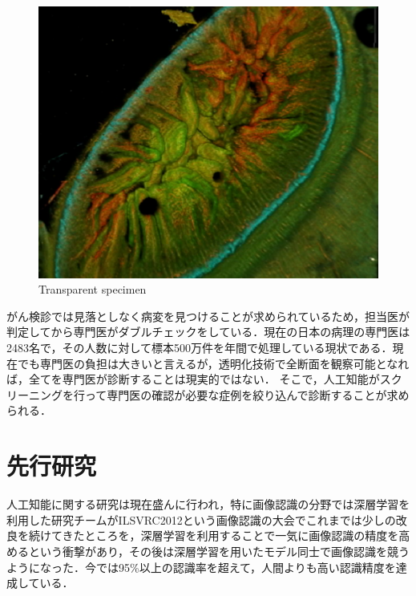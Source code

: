 \begin{figure}[H]
\begin{minipage}{0.4\columnwidth}
	\end{minipage}
	\begin{minipage}{0.4\columnwidth}
		\centering
		\includegraphics[clip, width=\linewidth]{fig/chapter1/colon_microscope}
	\end{minipage}
	\caption{Transparent specimen}
	\label{fig:lucid}
\end{figure}

がん検診では見落としなく病変を見つけることが求められているため，担当医が判定してから専門医がダブルチェックをしている．現在の日本の病理の専門医は2483名\cite{pathology}で，その人数に対して標本500万件を年間で処理している現状である．現在でも専門医の負担は大きいと言えるが，透明化技術で全断面を観察可能となれば，全てを専門医が診断することは現実的ではない．
そこで，人工知能がスクリーニングを行って専門医の確認が必要な症例を絞り込んで診断することが求められる．

\section{先行研究}
人工知能に関する研究は現在盛んに行われ，特に画像認識の分野では深層学習\cite{lecun2015deep}を利用した研究チームがILSVRC2012という画像認識の大会でこれまでは少しの改良を続けてきたところを，深層学習を利用することで一気に画像認識の精度を高めるという衝撃があり，その後は深層学習を用いたモデル同士で画像認識を競うようになった．今では95\%以上の認識率を超えて，人間よりも高い認識精度を達成している．

